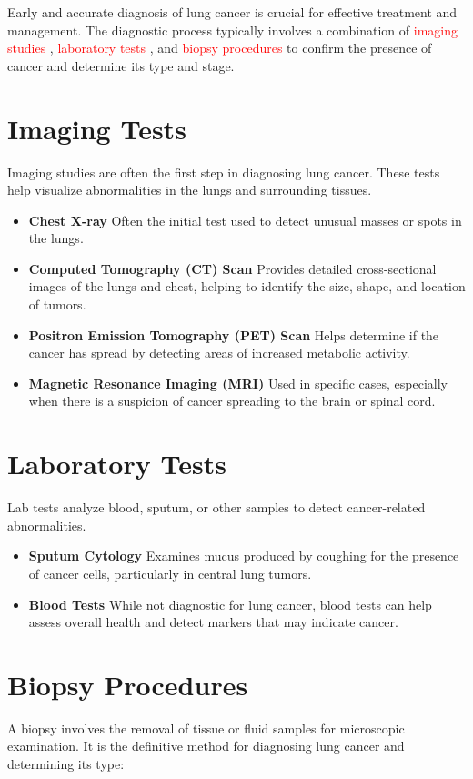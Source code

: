 Early and accurate diagnosis of lung cancer is crucial for effective treatment and management. The diagnostic process typically involves a combination of \textcolor{red}{imaging studies} , \textcolor{red}{laboratory tests} , and \textcolor{red}{biopsy procedures} to confirm the presence of cancer and determine its type and stage.

\section{Imaging Tests} 
Imaging studies are often the first step in diagnosing lung cancer. These tests help visualize abnormalities in the lungs and surrounding tissues.

\begin{itemize}
    \item \textbf{Chest X-ray} Often the initial test used to detect unusual masses or spots in the lungs.
    \item \textbf{Computed Tomography (CT) Scan} Provides detailed cross-sectional images of the lungs and chest, helping to identify the size, shape, and location of tumors.
    \item \textbf{Positron Emission Tomography (PET) Scan} Helps determine if the cancer has spread by detecting areas of increased metabolic activity.
    \item \textbf{Magnetic Resonance Imaging (MRI)} Used in specific cases, especially when there is a suspicion of cancer spreading to the brain or spinal cord.
\end{itemize}

\section{Laboratory Tests}
Lab tests analyze blood, sputum, or other samples to detect cancer-related abnormalities.

\begin{itemize}
    \item \textbf{Sputum Cytology} Examines mucus produced by coughing for the presence of cancer cells, particularly in central lung tumors.
    \item \textbf{Blood Tests} While not diagnostic for lung cancer, blood tests can help assess overall health and detect markers that may indicate cancer.
\end{itemize}

\section{Biopsy Procedures} 
A biopsy involves the removal of tissue or fluid samples for microscopic examination. It is the definitive method for diagnosing lung cancer and determining its type:

